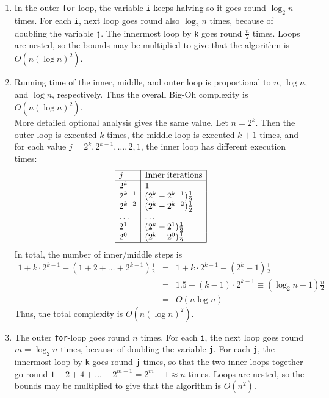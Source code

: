 \documentclass[]{article}
\begin{document}
\begin{enumerate}

\item
In the outer {\tt for}-loop, the variable {\tt i} keeps halving
so it goes round $\log_{2}n$ times. For each {\tt i},
next loop goes round also $\log_{2}n$ times, because
of doubling the variable {\tt j}. The innermost loop 
by {\tt k} goes round $\frac{n}{2}$ times.
Loops are nested, so the bounds may be multiplied to give that
the algorithm is $O \left ( n (\log n)^{2} \right )$.

\item 
Running time of the inner, middle, and outer loop is proportional to $n$,
$\log n$, and $\log n$, respectively. Thus the overall Big-Oh
complexity is $O(n (\log n)^{2})$.\\

More detailed optional analysis gives the same value.
Let $n=2^k$. Then the outer loop is executed $k$ times, the
middle loop is executed $k+1$ times, and
for each value $j=2^{k},2^{k-1},\ldots,2,1$, the inner loop 
has different execution times:
\[
\begin{array}{|l|l|}\hline
j & \mathrm{Inner} \; \mathrm{iterations} \\ \hline
2^k & 1 \\
2^{k-1} & (2^{k}-2^{k-1})\frac{1}{2}\\
2^{k-2} & (2^{k}-2^{k-2})\frac{1}{2}\\
\ldots & \ldots \\
2^1 & (2^{k}-2^{1})\frac{1}{2}\\
2^0 & (2^{k}-2^{0})\frac{1}{2}\\ \hline
\end{array}
\]
In total, the number of inner/middle steps is 
\begin{eqnarray*}
1 + k \cdot 2^{k-1} - (1+2+\ldots+2^{k-1})\frac{1}{2} & = &
1 + k \cdot 2^{k-1} - (2^{k}-1)\frac{1}{2} \\
& = & 1.5 + (k-1) \cdot 2^{k-1} \equiv (\log_{2}n - 1)\frac{n}{2} \\
& = & O(n \log n)
\end{eqnarray*}
Thus, the total complexity is $O(n (\log n)^{2})$. 

\item
The outer {\tt for}-loop goes round $n$ times. For each {\tt i},
the next loop goes round $m=\log_{2}n$ times, because
of doubling the variable {\tt j}. For each {\tt j}, the innermost loop 
by {\tt k} goes round {\tt j} times, so that the two inner
loops together go round
$1+2+4+\ldots + 2^{m-1}=2^{m}-1 \approx n$ times.
Loops are nested, so the bounds may be multiplied to give that
the algorithm is $O \left ( n^{2} \right )$.


\end{enumerate}
\end{document}
